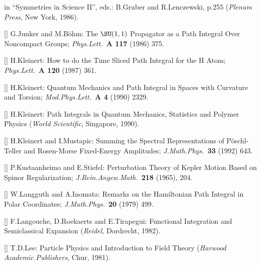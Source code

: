 in ``Symmetries in Science II'', eds.: B.Gruber and R.Lenczewski, p.255
({\it Plenum Press}, New York, 1986).
\item{[\BJa]}
G.Junker and M.B\"ohm:
The $\SU(1,1)$ Propagator as a Path Integral Over Noncompact Groups;
{\it Phys.Lett.}\ {\bf A 117} (1986) 375.
\item{[\KLEh]}
H.Kleinert:
How to do the Time Sliced Path Integral for the H Atom;
{\it Phys.Lett.}\ {\bf A 120} (1987) 361.
\item{[\KLEk]}
H.Kleinert:
Quantum Mechanics and Path Integral in Spaces with Curvature and
Torsion;
{\it Mod.Phys.Lett.}\ {\bf A 4} (1990) 2329.
\item{[\KLEm]}
H.Kleinert:
Path Integrals in Quantum Mechanics, Statistics and Polymer Physics
({\it World Scientific}, Singapore, 1990).
\item{[\KLEMUS]}
H.Kleinert and I.Mustapic:
Summing the Spectral Representations of P\"oschl-Teller and
Rosen-Morse Fixed-Energy Amplitudes;
{\it J.Math.Phys.}\ {\bf 33} (1992) 643.
\item{[\KUST]}
P.Kustaanheimo and E.Stiefel:
Perturbation Theory of Kepler Motion Based on Spinor Regularization;
{\it J.Rein.Angew.Math.}\ {\bf 218} (1965), 204.
\item{[\LAI]}
W.Langguth and A.Inomata:
Remarks on the Hamiltonian Path Integral in Polar Coordinates;
{\it J.Math.Phys.}\ {\bf 20} (1979) 499.
\item{[\LRTd]}
F.Langouche, D.Roekaerts and E.Tirapegui:
Functional Integration and Semiclassical Expansion
({\it Reidel}, Dordrecht, 1982).
\item{[\LEEb]}
T.D.Lee:
Particle Physics and Introduction to Field Theory
({\it Harwood Academic Publishers}, Chur, 1981).
